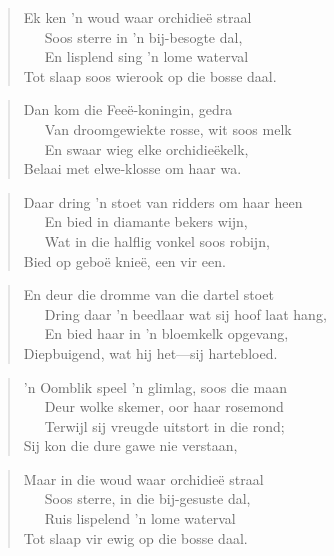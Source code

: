 \begin{verse}
Ek ken ’n woud waar orchidie\"e straal \\
\ \ \ Soos sterre in ’n bij-besogte dal, \\
\ \ \ En lisplend sing ’n lome waterval \\
Tot slaap soos wierook op die bosse daal. \\
\end{verse}

\begin{verse}
Dan kom die Fee\"e-koningin, gedra \\
\ \ \ Van droomgewiekte rosse, wit soos melk \\
\ \ \ En swaar wieg elke orchidie\"ekelk, \\
Belaai met elwe-klosse om haar wa. \\
\end{verse}

\begin{verse}
Daar dring ’n stoet van ridders om haar heen \\
\ \ \ En bied in diamante bekers wijn, \\
\ \ \ Wat in die halflig vonkel soos robijn, \\
Bied op gebo\"e knie\"e, een vir een. \\
\end{verse}

\begin{verse}
En deur die dromme van die dartel stoet \\
\ \ \ Dring daar ’n beedlaar wat sij hoof laat hang, \\
\ \ \ En bied haar in ’n bloemkelk opgevang, \\
Diepbuigend, wat hij het—sij hartebloed. \\
\end{verse}

\begin{verse}
’n Oomblik speel ’n glimlag, soos die maan \\
\ \ \ Deur wolke skemer, oor haar rosemond \\
\ \ \ Terwijl sij vreugde uitstort in die rond; \\
Sij kon die dure gawe nie verstaan, \\
\end{verse}

\begin{verse}
Maar in die woud waar orchidie\"e straal \\
\ \ \ Soos sterre, in die bij-gesuste dal, \\
\ \ \ Ruis lispelend ’n lome waterval \\
Tot slaap vir ewig op die bosse daal.
\end{verse}